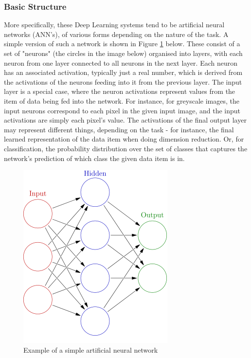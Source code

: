 \documentclass[11pt]{article} %
\theoremstyle{plain}
\theoremstyle{definition}
\begin{document}
\subsubsection{Basic Structure}
More specifically, these Deep Learning systems tend to be artificial neural networks (ANN's), of various forms depending on the nature of the task. A simple version of such a network \cite{wiki:simple_ann} is shown in Figure \ref{fig:simple_ann} below. These consist of a set of "neurons" (the circles in the image below) organised into layers, with each neuron from one layer connected to all neurons in the next layer. Each neuron has an associated activation, typically just a real number, which is derived from the activations of the neurons feeding into it from the previous layer. The input layer is a special case, where the neuron activations represent values from the item of data being fed into the network. For instance, for greyscale images, the input neurons correspond to each pixel in the given input image, and the input activations are simply each pixel's value. The activations of the final output layer may represent different things, depending on the task - for instance, the final learned representation of the data item when doing dimension reduction. Or, for classification, the probability distribution over the set of classes that captures the network's prediction of which class the given data item is in. 
\begin{figure}[!ht]
  \centering    
  \caption{Example of a simple artificial neural network}
  \label{fig:simple_ann}
  \includegraphics[scale=0.5]{simple_ann.png}
\end{figure}
\\
\end{document}
